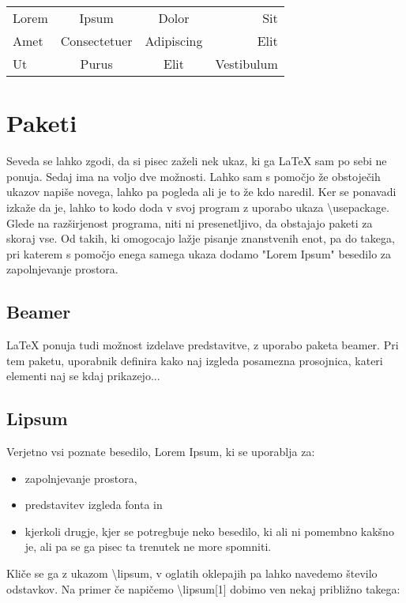 \documentclass[a4paper]{book}
\newcommand\tbs{\textbackslash{}}
\begin{document}
\begin{tabular}{|l c||c|r|}
\hline
Lorem & Ipsum & Dolor & Sit \\
Amet & Consectetuer & Adipiscing & Elit \\ \hline \hline
Ut & Purus & Elit & Vestibulum \\ \hline

\end{tabular}



\section{Paketi}
Seveda se lahko zgodi, da si pisec zaželi nek ukaz, ki ga \LaTeX{} sam po sebi ne ponuja. Sedaj ima na voljo dve možnosti. Lahko sam s pomočjo že obstoječih ukazov napiše novega, lahko pa pogleda ali je to že kdo naredil. Ker se ponavadi izkaže da je, lahko to kodo doda v svoj program z uporabo ukaza \tbs{}usepackage. Glede na razširjenost programa, niti ni presenetljivo, da obstajajo paketi za skoraj vse. Od takih, ki omogocajo lažje pisanje znanstvenih enot, pa do takega, pri katerem s pomočjo enega samega ukaza dodamo "Lorem Ipsum" besedilo za zapolnjevanje prostora.

\subsection{Beamer}
\LaTeX{} ponuja tudi možnost izdelave predstavitve, z uporabo paketa beamer. Pri tem paketu, uporabnik definira kako naj izgleda posamezna prosojnica, kateri elementi naj se kdaj prikazejo...

\subsection{Lipsum}
Verjetno vsi poznate besedilo, Lorem Ipsum, ki se uporablja za:
\begin{itemize}
\item zapolnjevanje prostora,
\item predstavitev izgleda fonta in
\item kjerkoli drugje, kjer se potregbuje neko besedilo, ki ali ni pomembno kakšno je, ali pa se ga pisec ta trenutek ne more spomniti.
\end{itemize}

Kliče se ga z ukazom \tbs{}lipsum, v oglatih oklepajih pa lahko navedemo število odstavkov. 
Na primer če napičemo \tbs{}lipsum[1] dobimo ven nekaj približno takega:\\
\end{document}
